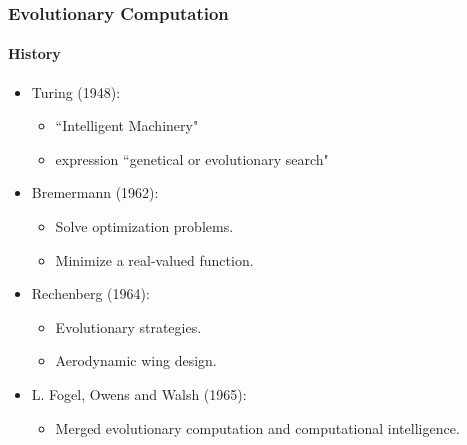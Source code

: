 \frame
{
	\frametitle{Evolutionary Computation}
	\framesubtitle{History}

	
	\begin{itemize}
		\item Turing (1948):
			\begin{itemize}
				\item ``Intelligent Machinery"
				\item expression ``genetical or evolutionary search"
			\end{itemize}
		\item Bremermann (1962):
			\begin{itemize}
				\item Solve optimization problems.
				\item Minimize a real-valued function.
			\end{itemize}
		\item Rechenberg (1964):
			\begin{itemize}
				\item Evolutionary strategies.
				\item Aerodynamic wing design.
			\end{itemize}
		\item L. Fogel, Owens and Walsh (1965):
			\begin{itemize}
				\item Merged evolutionary computation and computational intelligence.
			\end{itemize}
	\end{itemize}	
}

